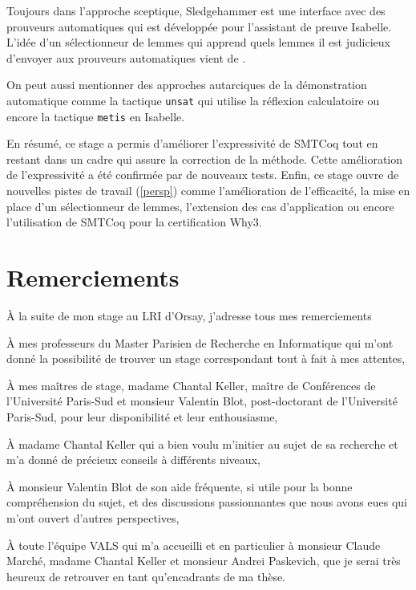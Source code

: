 \documentclass[11pt]{article}
\begin{document}
Toujours dans l'approche sceptique, Sledgehammer \cite{sledgehammer_manual} est une interface avec des prouveurs automa\-tiques qui est développée pour l'assistant de preuve Isabelle. L'idée d'un sélection\-neur de lemmes qui apprend quels lemmes il est judicieux d'envoyer aux prouveurs automa\-tiques \cite{hol_selector} vient de .

On peut aussi mentionner des approches autarciques de la démonstration automatique comme la tactique \texttt{unsat} \cite{smt_autarcique} qui utilise la réflexion calculatoire ou encore la tactique \texttt{metis} en Isabelle. \medbreak

En résumé, ce stage a permis d'améliorer l'expressivité de SMTCoq tout en restant dans un cadre qui assure la correction de la méthode. Cette amélioration de l'expressivité a été confirmée par de nouveaux tests. Enfin, ce stage ouvre de nouvelles pistes de travail (\ref{persp}) comme l'amélioration de l'efficacité, la mise en place d'un sélectionneur de lemmes, l'extension des cas d'application ou encore l'utilisation de SMTCoq pour la certification Why3.

\newpage
\pagestyle{empty}
\section*{Remerciements}

\bigbreak\bigbreak\bigbreak

À la suite de mon stage au LRI d'Orsay, j'adresse tous mes remerciements \bigbreak\bigbreak

À mes professeurs du Master Parisien de Recherche en Informatique qui m'ont donné la possibilité de trouver un stage correspondant tout à fait à mes attentes, \bigbreak\bigbreak

À mes maîtres de stage, madame Chantal Keller, maître de Conférences de l'Université Paris-Sud  et monsieur Valentin Blot, post-doctorant de l'Université Paris-Sud, pour leur disponibilité et leur enthousiasme,

À madame Chantal Keller qui a bien voulu m'initier au sujet de sa recherche et m'a donné de précieux conseils à différents niveaux,

À monsieur Valentin Blot de son aide fréquente, si utile pour la bonne compréhension du sujet, et des discussions passionnantes que nous avons eues qui m'ont ouvert d'autres perspectives, \bigbreak\bigbreak

À toute l'équipe VALS qui m'a accueilli et en particulier à monsieur Claude Marché, madame Chantal Keller et monsieur Andrei Paskevich, que je serai très heureux de retrouver en tant qu'encadrants de ma thèse.
\end{document}
